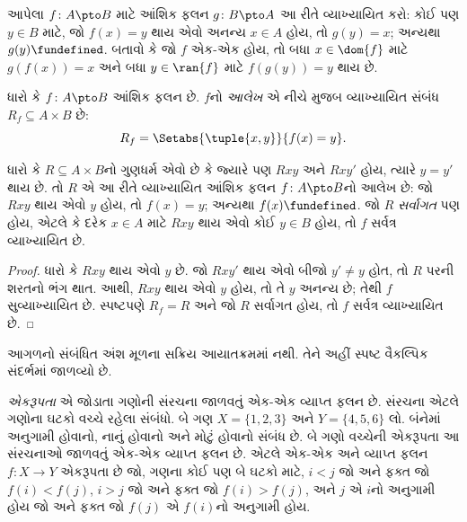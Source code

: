 \begin{prob}
આપેલા $f\colon A \pto B$ માટે આંશિક ફલન
$g\colon B \pto
A$ આ રીતે વ્યાખ્યાયિત કરો: કોઈ પણ $y \in B$ માટે,
જો $f(x) = y$ થાય એવો અનન્ય $x \in A$ હોય,
તો $g(y) = x$; અન્યથા $g(y) \fundefined$.
બતાવો કે જો $f$ એક-એક હોય, તો બધા $x \in \dom{f}$
માટે $g(f(x)) = x$ અને બધા $y \in \ran{f}$ માટે
$f(g(y)) = y$ થાય છે.
\end{prob}

\begin{defn}[આંશિક ફલનનો આલેખ]
ધારો કે $f\colon A \pto B$ આંશિક ફલન છે.
$f$નો \emph{આલેખ} એ નીચે મુજબ વ્યાખ્યાયિત સંબંધ
$R_f \subseteq A \times B$ છે:
\[
R_f = \Setabs{\tuple{x,y}}{f(x) = y}.
\]
\end{defn}

\begin{prop}
ધારો કે $R \subseteq A \times B$નો ગુણધર્મ એવો છે કે
જ્યારે પણ $Rxy$ અને $Rxy'$ હોય, ત્યારે $y = y'$ થાય છે.
તો $R$ એ આ રીતે વ્યાખ્યાયિત આંશિક ફલન
$f\colon A \pto B$નો આલેખ છે: જો $Rxy$ થાય એવો $y$
હોય, તો $f(x) = y$; અન્યથા $f(x) \fundefined$.
જો $R$ \emph{સર્વાગત} પણ હોય, એટલે કે દરેક $x \in A$
માટે $Rxy$ થાય એવો કોઈ $y \in B$ હોય, તો $f$
સર્વત્ર વ્યાખ્યાયિત છે.
\end{prop}

\begin{proof}
ધારો કે $Rxy$ થાય એવો $y$ છે. જો $Rxy'$ થાય એવો
બીજો $y'
\neq y$ હોત, તો $R$ પરની શરતનો ભંગ થાત.
આથી, $Rxy$ થાય એવો $y$ હોય, તો તે $y$ અનન્ય છે;
તેથી $f$ સુવ્યાખ્યાયિત છે. સ્પષ્ટપણે $R_f = R$
અને જો $R$ સર્વાગત હોય, તો $f$ સર્વત્ર વ્યાખ્યાયિત છે.
\end{proof}
\endgroup


\OLEndChapterHook


\begin{editorial}
આગળનો સંબંધિત અંશ મૂળના સક્રિય આયાતક્રમમાં નથી. તેને અહીં સ્પષ્ટ વૈકલ્પિક સંદર્ભમાં જાળવ્યો છે.
\end{editorial}
\begingroup
\makeatletter{}\makeatother

\label{guunit:OLP-0717}


\begin{explain}
\emph{એકરૂપતા} એ જોડાતા ગણોની સંરચના જાળવતું એક-એક વ્યાપ્ત ફલન છે.
સંરચના એટલે ગણોના ઘટકો વચ્ચે રહેલા સંબંધો.
બે ગણ $X=\{1,2,3\}$ અને $Y=\{4,5,6\}$ લો.
બંનેમાં અનુગામી હોવાનો, નાનું હોવાનો અને મોટું હોવાનો સંબંધ છે.
બે ગણો વચ્ચેની એકરૂપતા આ સંરચનાઓ જાળવતું એક-એક વ્યાપ્ત ફલન છે.
એટલે એક-એક અને વ્યાપ્ત ફલન~$f \colon X
\to Y$ એકરૂપતા છે જો, ગણના કોઈ પણ બે ઘટકો માટે,
$i<j$ જો અને ફક્ત જો $f(i)<f(j)$,
$i>j$ જો અને ફક્ત જો $f(i)>f(j)$,
અને $j$ એ $i$નો અનુગામી હોય જો અને ફક્ત જો $f(j)$ એ
$f(i)$નો અનુગામી હોય.
\end{explain}

